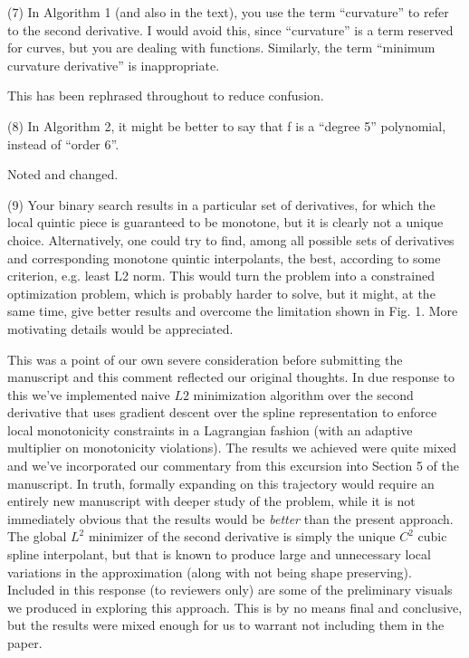 \goodbreak
{\parindent=20pt \it
  
\item{(7)} In Algorithm 1 (and also in the text), you use the term
  ``curvature'' to refer to the second derivative. I would avoid this,
  since ``curvature'' is a term reserved for curves, but you are dealing
  with functions. Similarly, the term ``minimum curvature derivative''
  is inappropriate.

}

This has been rephrased throughout to reduce confusion.


\goodbreak
{\parindent=20pt \it
  
\item{(8)} In Algorithm 2, it might be better to say that f is a
  ``degree 5'' polynomial, instead of ``order 6''.

}

Noted and changed.

{\parindent=20pt \it
  
\item{(9)} Your binary search results in a particular set of
  derivatives, for which the local quintic piece is guaranteed to be
  monotone, but it is clearly not a unique choice. Alternatively, one
  could try to find, among all possible sets of derivatives and
  corresponding monotone quintic interpolants, the best, according to
  some criterion, e.g. least L2 norm. This would turn the problem into
  a constrained optimization problem, which is probably harder to
  solve, but it might, at the same time, give better results and
  overcome the limitation shown in Fig. 1. More motivating details
  would be appreciated.

}

This was a point of our own severe consideration before submitting the
manuscript and this comment reflected our original thoughts. In due
response to this we've implemented naive $L2$ minimization algorithm
over the second derivative that uses gradient descent over the spline
representation to enforce local monotonicity constraints in a
Lagrangian fashion (with an adaptive multiplier on monotonicity
violations). The results we achieved were quite mixed and we've
incorporated our commentary from this excursion into Section 5 of the
manuscript. In truth, formally expanding on this trajectory would
require an entirely new manuscript with deeper study of the problem,
while it is not immediately obvious that the results would be {\it
  better} than the present approach. The global $L^2$ minimizer of the
second derivative is simply the unique $C^2$ cubic spline interpolant,
but that is known to produce large and unnecessary local variations in
the approximation (along with not being shape preserving). Included in
this response (to reviewers only) are some of the preliminary visuals
we produced in exploring this approach. This is by no means final and
conclusive, but the results were mixed enough for us to warrant not
including them in the paper.


